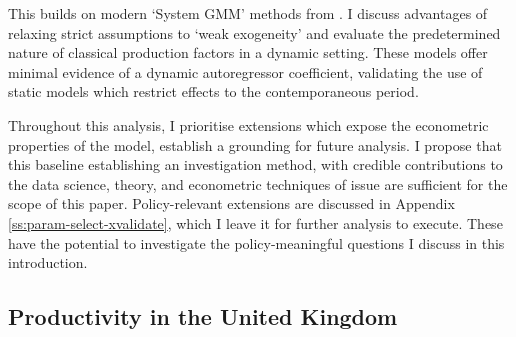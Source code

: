 This builds on modern `System GMM' methods from \cite{Blundell1998}.
I discuss advantages of relaxing strict assumptions to `weak exogeneity'
and evaluate the predetermined nature of classical production factors in a dynamic setting.
These models offer minimal evidence of a dynamic autoregressor coefficient,
validating the use of static models which restrict effects to the contemporaneous period.
\par
Throughout this analysis, I prioritise extensions which expose the econometric properties of the model,
establish a grounding for future analysis.
I propose that this baseline establishing an investigation method,
with credible contributions to the data science, theory, and econometric techniques of issue
are sufficient for the scope of this paper.
Policy-relevant extensions are discussed in Appendix \ref{ss:param-select-xvalidate},
which I leave it for further analysis to execute.
These have the potential to investigate the policy-meaningful questions I discuss in this introduction.

\subsection{Productivity in the United Kingdom}

